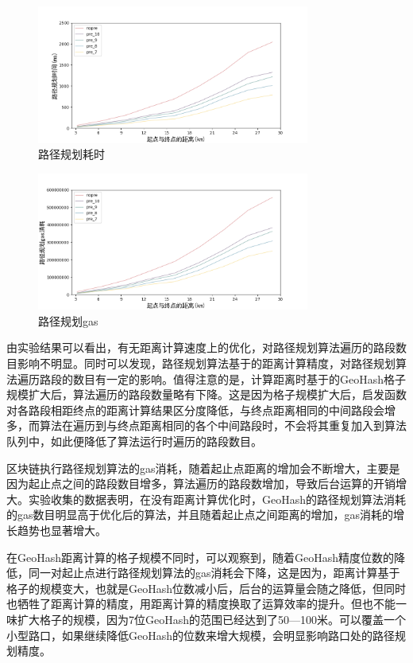 \begin{figure}[h]
  \centering
  \includegraphics[height=0.3\textheight,width=0.8\textwidth]{figures/路径规划耗时}
  \caption{路径规划耗时}\label{fig:navTime}
\end{figure}

\begin{figure}[h]
  \centering
  \includegraphics[height=0.3\textheight,width=0.8\textwidth]{figures/路径规划gas}
  \caption{路径规划gas}\label{fig:navGas}
\end{figure}

由实验结果可以看出，有无距离计算速度上的优化，对路径规划算法遍历的路段数目影响不明显。同时可以发现，路径规划算法基于的距离计算精度，对路径规划算法遍历路段的数目有一定的影响。值得注意的是，计算距离时基于的GeoHash格子规模扩大后，算法遍历的路段数量略有下降。这是因为格子规模扩大后，启发函数对各路段相距终点的距离计算结果区分度降低，与终点距离相同的中间路段会增多，而算法在遍历到与终点距离相同的各个中间路段时，不会将其重复加入到算法队列中，如此便降低了算法运行时遍历的路段数目。

区块链执行路径规划算法的gas消耗，随着起止点距离的增加会不断增大，主要是因为起止点之间的路段数目增多，算法遍历的路段数增加，导致后台运算的开销增大。实验收集的数据表明，在没有距离计算优化时，GeoHash的路径规划算法消耗的gas数目明显高于优化后的算法，并且随着起止点之间距离的增加，gas消耗的增长趋势也显著增大。

​在GeoHash距离计算的格子规模不同时，可以观察到，随着GeoHash精度位数的降低，同一对起止点进行路径规划算法的gas消耗会下降，这是因为，距离计算基于格子的规模变大，也就是GeoHash位数减小后，后台的运算量会随之降低，但同时也牺牲了距离计算的精度，用距离计算的精度换取了运算效率的提升。但也不能一味扩大格子的规模，因为7位GeoHash的范围已经达到了50—100米。可以覆盖一个小型路口，如果继续降低GeoHash的位数来增大规模，会明显影响路口处的路径规划精度。

